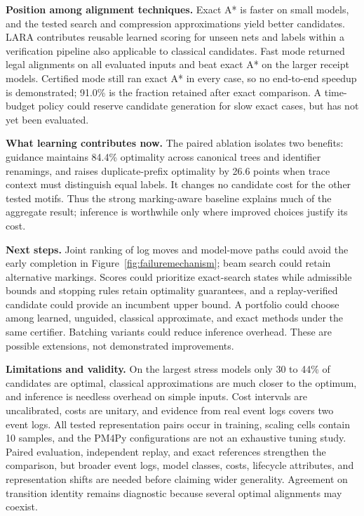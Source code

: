 \documentclass[manuscript,screen,nonacm]{acmart}
\begin{document}
\textbf{Position among alignment techniques.} Exact A* is faster on small models, and the tested search and compression approximations yield better candidates. LARA contributes reusable learned scoring for unseen nets and labels within a verification pipeline also applicable to classical candidates. Fast mode returned legal alignments on all evaluated inputs and beat exact A* on the larger receipt models. Certified mode still ran exact A* in every case, so no end-to-end speedup is demonstrated; 91.0\% is the fraction retained after exact comparison. A time-budget policy could reserve candidate generation for slow exact cases, but has not yet been evaluated.

\textbf{What learning contributes now.} The paired ablation isolates two benefits: guidance maintains 84.4\% optimality across canonical trees and identifier renamings, and raises duplicate-prefix optimality by 26.6 points when trace context must distinguish equal labels. It changes no candidate cost for the other tested motifs. Thus the strong marking-aware baseline explains much of the aggregate result; inference is worthwhile only where improved choices justify its cost.

\textbf{Next steps.} Joint ranking of log moves and model-move paths could avoid the early completion in Figure~\ref{fig:failuremechanism}; beam search could retain alternative markings. Scores could prioritize exact-search states while admissible bounds and stopping rules retain optimality guarantees, and a replay-verified candidate could provide an incumbent upper bound. A portfolio could choose among learned, unguided, classical approximate, and exact methods under the same certifier. Batching variants could reduce inference overhead. These are possible extensions, not demonstrated improvements.

\textbf{Limitations and validity.} On the largest stress models only 30 to 44\% of candidates are optimal, classical approximations are much closer to the optimum, and inference is needless overhead on simple inputs. Cost intervals are uncalibrated, costs are unitary, and evidence from real event logs covers two event logs. All tested representation pairs occur in training, scaling cells contain 10 samples, and the PM4Py configurations are not an exhaustive tuning study. Paired evaluation, independent replay, and exact references strengthen the comparison, but broader event logs, model classes, costs, lifecycle attributes, and representation shifts are needed before claiming wider generality. Agreement on transition identity remains diagnostic because several optimal alignments may coexist.
\end{document}
